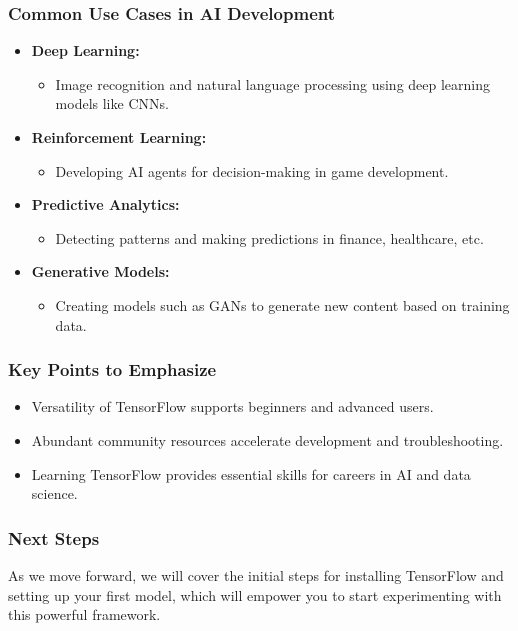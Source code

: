\documentclass{beamer}
\begin{document}
\begin{frame}
    \frametitle{Common Use Cases in AI Development}
    \begin{itemize}
        \item \textbf{Deep Learning:}
        \begin{itemize}
            \item Image recognition and natural language processing using deep learning models like CNNs.
        \end{itemize}

        \item \textbf{Reinforcement Learning:}
        \begin{itemize}
            \item Developing AI agents for decision-making in game development.
        \end{itemize}

        \item \textbf{Predictive Analytics:}
        \begin{itemize}
            \item Detecting patterns and making predictions in finance, healthcare, etc.
        \end{itemize}

        \item \textbf{Generative Models:}
        \begin{itemize}
            \item Creating models such as GANs to generate new content based on training data.
        \end{itemize}
    \end{itemize}
\end{frame}

\begin{frame}
    \frametitle{Key Points to Emphasize}
    \begin{itemize}
        \item Versatility of TensorFlow supports beginners and advanced users.
        \item Abundant community resources accelerate development and troubleshooting.
        \item Learning TensorFlow provides essential skills for careers in AI and data science.
    \end{itemize}
\end{frame}

\begin{frame}
    \frametitle{Next Steps}
    As we move forward, we will cover the initial steps for installing TensorFlow and setting up your first model, which will empower you to start experimenting with this powerful framework.
\end{frame}
\end{document}

